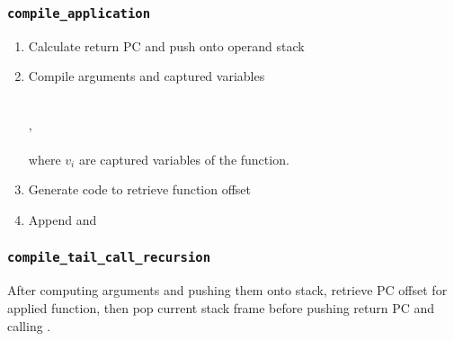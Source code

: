 \subsubsection{\texttt{compile\_application}}
\begin{enumerate}
    \item Calculate return PC and push onto operand stack
    \item Compile arguments and captured variables\\\\
    \begin{prooftree}
    \end{prooftree}, \\\\where $v_i$ are captured variables of the function. 
    \item Generate code to retrieve function offset
    \item Append  and 
\end{enumerate}

\subsubsection{\texttt{compile\_tail\_call\_recursion}}
After computing arguments and pushing them onto stack, retrieve PC offset for applied function, then pop current stack frame before pushing return PC and calling . 
